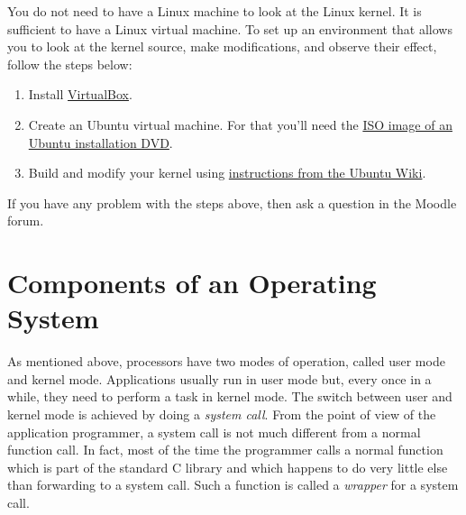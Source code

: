 You do not need to have a Linux machine to look at the Linux kernel.
It is sufficient to have a Linux virtual machine.
To set up an environment that allows you
  to look at the kernel source, make modifications, and observe their effect,
  follow the steps below:
\begin{enumerate}
\item Install \href{https://www.virtualbox.org/wiki/Downloads}{VirtualBox}.
\item Create an Ubuntu virtual machine.
  For that you'll need the
    \href{https://www.ubuntu.com/download/desktop}%
      {ISO image of an Ubuntu installation DVD}.
\item Build and modify your kernel using
  \href{https://wiki.ubuntu.com/Kernel/BuildYourOwnKernel}%
    {instructions from the Ubuntu Wiki}.
\end{enumerate}
If you have any problem with the steps above,
  then ask a question in the Moodle forum.

\section{Components of an Operating System}

As mentioned above,
  processors have two modes of operation,
  called user mode and kernel mode.
Applications usually run in user mode
  but, every once in a while,
   they need to perform a task in kernel mode.
The switch between user and kernel mode
  is achieved by doing a \emph{system call}.
From the point of view of the application programmer,
  a system call is not much different from a normal function call.
In fact,
  most of the time the programmer calls a normal function
  which is part of the standard C library
  and which happens to do very little else than forwarding to a system call.
Such a function is called a \emph{wrapper} for a system call.

